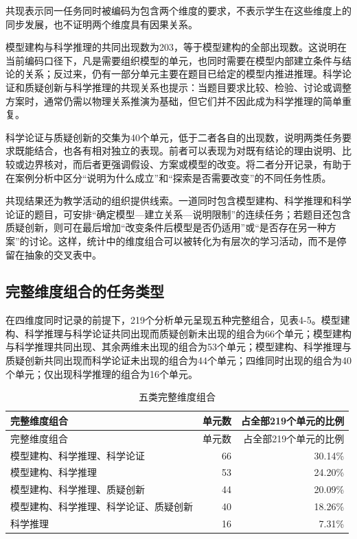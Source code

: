 \documentclass[
  12pt,
  a4paper]{ctexbook}
\begin{document}
共现表示同一任务同时被编码为包含两个维度的要求，不表示学生在这些维度上的同步发展，也不证明两个维度具有因果关系。

模型建构与科学推理的共同出现数为203，等于模型建构的全部出现数。这说明在当前编码口径下，凡是需要组织模型的单元，也同时需要在模型内部建立条件与结论的关系；反过来，仍有一部分单元主要在题目已给定的模型内推进推理。科学论证和质疑创新与科学推理的共现关系也提示：当题目要求比较、检验、讨论或调整方案时，通常仍需以物理关系推演为基础，但它们并不因此成为科学推理的简单重复。

科学论证与质疑创新的交集为40个单元，低于二者各自的出现数，说明两类任务要求既能结合，也各有相对独立的表现。前者可以表现为对既有结论的理由说明、比较或边界核对，而后者更强调假设、方案或模型的改变。将二者分开记录，有助于在案例分析中区分``说明为什么成立''和``探索是否需要改变''的不同任务性质。

共现结果还为教学活动的组织提供线索。一道同时包含模型建构、科学推理和科学论证的题目，可安排``确定模型---建立关系---说明限制''的连续任务；若题目还包含质疑创新，则可在最后增加``改变条件后模型是否仍适用''或``是否存在另一种方案''的讨论。这样，统计中的维度组合可以被转化为有层次的学习活动，而不是停留在抽象的交叉表中。

\subsection{完整维度组合的任务类型}\label{ux5b8cux6574ux7ef4ux5ea6ux7ec4ux5408ux7684ux4efbux52a1ux7c7bux578b}

在四维度同时记录的前提下，219个分析单元呈现五种完整组合，见表4-5。模型建构、科学推理与科学论证共同出现而质疑创新未出现的组合为66个单元；模型建构与科学推理共同出现、其余两维未出现的组合为53个单元；模型建构、科学推理与质疑创新共同出现而科学论证未出现的组合为44个单元；四维同时出现的组合为40个单元；仅出现科学推理的组合为16个单元。

\begin{longtable}[]{@{}lrr@{}}
\caption{五类完整维度组合}\tabularnewline
\toprule\noalign{}
\rowcolor{ThesisPale}
完整维度组合 & 单元数 & 占全部219个单元的比例 \\
\midrule\noalign{}
\endfirsthead
\toprule\noalign{}
\rowcolor{ThesisPale}
完整维度组合 & 单元数 & 占全部219个单元的比例 \\
\midrule\noalign{}
\endhead
\bottomrule\noalign{}
\endlastfoot
模型建构、科学推理、科学论证 & 66 & 30.14\% \\
模型建构、科学推理 & 53 & 24.20\% \\
模型建构、科学推理、质疑创新 & 44 & 20.09\% \\
模型建构、科学推理、科学论证、质疑创新 & 40 & 18.26\% \\
科学推理 & 16 & 7.31\% \\
\end{longtable}
\end{document}
